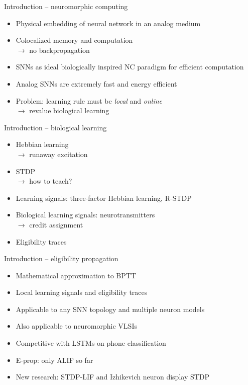 \documentclass[t]{beamer}
\begin{document}
  \begin{frame}{Introduction -- neuromorphic computing}
    \begin{itemize}[label=--]
      \item Physical embedding of neural network in an analog medium
      \item Colocalized memory and computation \\$\rightarrow$ no backpropagation
      \item SNNs as ideal biologically inspired NC paradigm for efficient computation
      \item Analog SNNs are extremely fast and energy efficient
      \item Problem: learning rule must be \emph{local} and \emph{online}\\$\rightarrow$ revalue biological learning
    \end{itemize}

  \end{frame}

  \begin{frame}{Introduction -- biological learning}
    \begin{itemize}[label=--]
      \item Hebbian learning \\$\rightarrow$ runaway excitation
      \item STDP \\$\rightarrow$ how to teach?
      \item Learning signals: three-factor Hebbian learning, R-STDP
      \item Biological learning signals: neurotransmitters\\$\rightarrow$ credit assignment
      \item Eligibility traces
    \end{itemize}
  \end{frame}

  \begin{frame}{Introduction -- eligibility propagation}
    \begin{itemize}[label=--]
      \item Mathematical approximation to BPTT
      \item Local learning signals and eligibility traces
      \item Applicable to any SNN topology and multiple neuron models
      \item Also applicable to neuromorphic VLSIs
      \item Competitive with LSTMs on phone classification
      \item E-prop: only ALIF so far
      \item New research: STDP-LIF and Izhikevich neuron display STDP
    \end{itemize}
  \end{frame}
\end{document}
